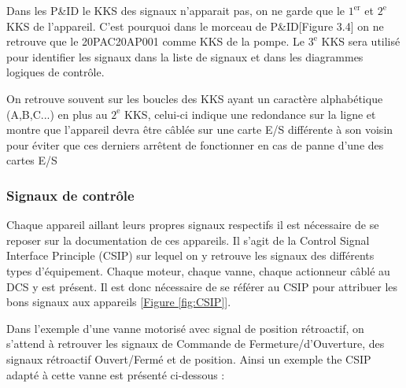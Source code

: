 \documentclass[11pt, openright]{book}
\begin{document}
Dans les P\&ID le KKS des signaux n'apparait pas, on ne garde que le $1^{\text{er}}$ et $2^{\text{e}}$ KKS de l'appareil. C'est pourquoi dans le morceau de P\&ID[Figure 3.4] on ne retrouve que le 20PAC20AP001 comme KKS de la pompe. Le $3^{\text{e}}$ KKS sera utilisé pour identifier les signaux dans la liste de signaux et dans les diagrammes logiques de contrôle.

On retrouve souvent sur les boucles des KKS ayant un caractère alphabétique (A,B,C...) en plus au $2^{\text{e}}$ KKS, celui-ci indique une redondance sur la ligne et montre que l'appareil devra être câblée sur une carte E/S différente à son voisin pour éviter que ces derniers arrêtent de fonctionner en cas de panne d'une des cartes E/S

\subsubsection{Signaux de contrôle}

Chaque appareil aillant leurs propres signaux respectifs il est nécessaire de se reposer sur la documentation de ces appareils. Il s'agit de la Control Signal Interface Principle (CSIP) sur lequel on y retrouve les signaux des différents types d'équipement. Chaque moteur, chaque vanne, chaque actionneur câblé au DCS y est présent. Il est donc nécessaire de se référer au CSIP pour attribuer les bons signaux aux appareils [\hyperref[fig:CSIP]{Figure \ref{fig:CSIP}}].

Dans l'exemple d'une vanne motorisé avec signal de position rétroactif, on s'attend à retrouver les signaux de Commande de Fermeture/d'Ouverture, des signaux rétroactif Ouvert/Fermé et de position. Ainsi un exemple the CSIP adapté à cette vanne est présenté ci-dessous :
\end{document}
